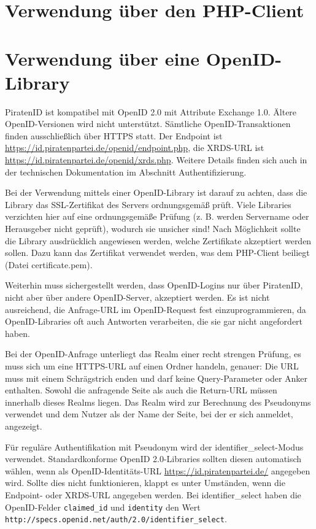 \newpage
\section{Verwendung über den PHP-Client}


\newpage
\section{Verwendung über eine OpenID-Library}
PiratenID ist kompatibel mit OpenID 2.0 mit Attribute Exchange 1.0. Ältere OpenID-Versionen wird nicht unterstützt.
Sämtliche OpenID-Transaktionen finden ausschließlich über HTTPS statt.
Der Endpoint ist \url{https://id.piratenpartei.de/openid/endpoint.php}, die XRDS-URL ist \url{https://id.piratenpartei.de/openid/xrds.php}.
Weitere Details finden sich auch in der technischen Dokumentation im Abschnitt Authentifizierung.

Bei der Verwendung mittels einer OpenID-Library ist darauf zu achten, dass die Library das SSL-Zertifikat des Servers ordnungsgemäß prüft.
Viele Libraries verzichten hier auf eine ordnungsgemäße Prüfung (z. B. werden Servername oder Herausgeber nicht geprüft), wodurch sie unsicher sind!
Nach Möglichkeit sollte die Library ausdrücklich angewiesen werden, welche Zertifikate akzeptiert werden sollen.
Dazu kann das Zertifikat verwendet werden, was dem PHP-Client beiliegt (Datei certificate.pem).

Weiterhin muss sichergestellt werden, dass OpenID-Logins nur über PiratenID, nicht aber über andere OpenID-Server, akzeptiert werden.
Es ist nicht ausreichend, die Anfrage-URL im OpenID-Request fest einzuprogrammieren,
da OpenID-Libraries oft auch Antworten verarbeiten, die sie gar nicht angefordert haben.

Bei der OpenID-Anfrage unterliegt das Realm einer recht strengen Prüfung, es muss sich um eine HTTPS-URL auf einen Ordner handeln, genauer:
Die URL muss mit einem Schrägstrich enden und darf keine Query-Parameter oder Anker enthalten.
Sowohl die anfragende Seite als auch die Return-URL müssen innerhalb dieses Realms liegen.
Das Realm wird zur Berechnung des Pseudonyms verwendet und dem Nutzer als der Name der Seite, bei der er sich anmeldet, angezeigt.

Für reguläre Authentifikation mit Pseudonym wird der identifier\_select-Modus verwendet.
Standardkonforme OpenID 2.0-Libraries sollten diesen automatisch wählen, wenn als OpenID-Identitäts-URL \url{https://id.piratenpartei.de/} angegeben wird.
Sollte dies nicht funktionieren, klappt es unter Umständen, wenn die Endpoint- oder XRDS-URL angegeben werden.
Bei identifier\_select haben die OpenID-Felder \texttt{claimed\_id} und \texttt{identity} den Wert \texttt{http://specs.openid.net/auth/2.0/identifier\_select}.


